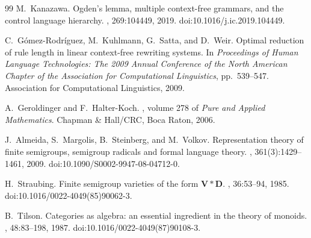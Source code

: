 \begin{thebibliography}{99}
M.~Kanazawa.
\newblock Ogden's lemma, multiple context-free grammars, and the control language hierarchy.
, 269:104449, 2019.
\newblock doi:10.1016/j.ic.2019.104449.

C.~G\'omez-Rodr\'iguez, M.~Kuhlmann, G.~Satta, and D.~Weir.
\newblock Optimal reduction of rule length in linear context-free rewriting systems.
\newblock In {\em Proceedings of Human Language Technologies: The 2009 Annual
Conference of the North American Chapter of the Association for Computational
Linguistics}, pp.~539--547. Association for Computational Linguistics, 2009.

A.~Geroldinger and F.~Halter-Koch.
, volume 278 of {\em Pure and Applied Mathematics}.
\newblock Chapman \& Hall/CRC, Boca Raton, 2006.

J.~Almeida, S.~Margolis, B.~Steinberg, and M.~Volkov.
\newblock Representation theory of finite semigroups, semigroup radicals and
formal language theory.
,
361(3):1429--1461, 2009.
\newblock doi:10.1090/S0002-9947-08-04712-0.

H.~Straubing.
\newblock Finite semigroup varieties of the form $\mathbf V*\mathbf D$.
, 36:53--94, 1985.
\newblock doi:10.1016/0022-4049(85)90062-3.

B.~Tilson.
\newblock Categories as algebra: an essential ingredient in the theory of monoids.
, 48:83--198, 1987.
\newblock doi:10.1016/0022-4049(87)90108-3.

\end{thebibliography}
